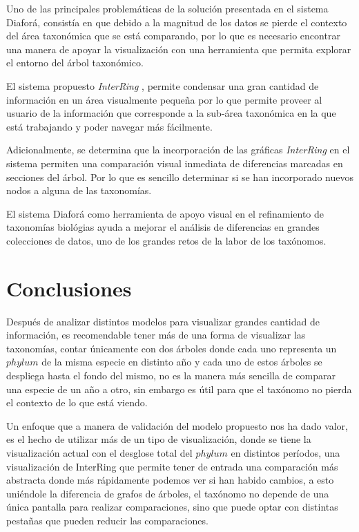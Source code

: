 \documentclass[journal]{IEEEtran}
\begin{document}
Uno de las principales problemáticas de la solución presentada en el sistema Diaforá, consistía en que debido a la magnitud de los datos se pierde el contexto del área taxonómica que se está comparando, por lo que es necesario encontrar
una manera de apoyar la visualización con una herramienta que permita explorar el entorno del árbol taxonómico.

El sistema propuesto \emph{InterRing} \cite{yang_ward_rundensteiner}, permite condensar una gran cantidad de información en un área visualmente pequeña por lo que permite
proveer al usuario de la información que corresponde a la sub-área taxonómica en la que está trabajando y poder navegar más fácilmente.

Adicionalmente, se determina que la incorporación de las gráficas \emph{InterRing} en el sistema permiten una comparación visual inmediata de diferencias marcadas en secciones del árbol.
Por lo que es sencillo determinar si se han incorporado nuevos nodos a alguna de las taxonomías.

El sistema Diaforá como herramienta de apoyo visual en el refinamiento de taxonomías biológias ayuda a mejorar el análisis de diferencias en grandes colecciones de datos, uno de los grandes 
retos de la labor de los taxónomos.

\section{Conclusiones}
Después de analizar distintos modelos para visualizar grandes cantidad de información, es recomendable tener más de una forma de visualizar las taxonomías, contar únicamente con dos árboles donde cada uno representa un $phylum$ de la misma especie en distinto año y cada uno de estos árboles se despliega hasta el fondo del mismo, no es la manera más sencilla de comparar una especie de un año a otro, sin embargo es útil para que el taxónomo no pierda el contexto de lo que está viendo. 

Un enfoque que a manera de validación del modelo propuesto nos ha dado valor, es el hecho de utilizar más de un tipo de visualización, donde se tiene la visualización actual con el desglose total del $phylum$ en distintos períodos, una visualización de InterRing que permite tener de entrada una comparación más abstracta donde más rápidamente podemos ver si han habido cambios, a esto uniéndole la diferencia de grafos de árboles, el taxónomo no depende de una única pantalla para realizar comparaciones, sino que puede optar con distintas pestañas que pueden reducir las comparaciones.
\end{document}
